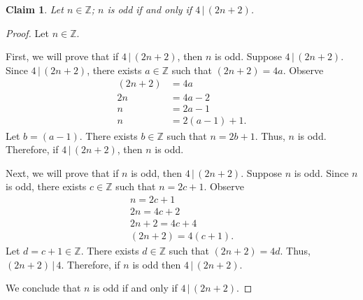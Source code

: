 \documentclass{article}
\newtheorem*{claim}{Claim}
\theoremstyle{definition}
\begin{document}
\begin{solution}
\begin{claim}
Let $n\in\mathbb{Z}$; $n$ is odd if and only if $4\,|\,(2n+2)$.
\end{claim}\begin{proof}
Let $n\in\mathbb{Z}$.

First, we will prove that if $4\,|\,(2n+2)$, then $n$ is odd. Suppose $4\,|\,(2n+2)$. Since $4\,|\,(2n+2)$, there exists $a\in\mathbb{Z}$ such that $(2n+2)=4a$. Observe
\begin{align*}
(2n+2)&=4a\\
2n&=4a-2\\
n&=2a-1\\
n&=2(a-1)+1.
\end{align*}
Let $b=(a-1)$. There exists $b\in\mathbb{Z}$ such that $n=2b+1$. Thus, $n$ is odd. Therefore, if $4\,|\,(2n+2)$, then $n$ is odd.

Next, we will prove that if $n$ is odd, then $4\,|\,(2n+2)$. Suppose $n$ is odd. Since $n$ is odd, there exists $c\in\mathbb{Z}$ such that $n=2c+1$. Observe
\begin{align*}
n=2c+1\\
2n=4c+2\\
2n+2=4c+4\\
(2n+2)=4(c+1).
\end{align*}
Let $d=c+1\in\mathbb{Z}$. There exists $d\in\mathbb{Z}$ such that $(2n+2)=4d$. Thus, $(2n+2)\,|\,4$. Therefore, if $n$ is odd then $4\,|\,(2n+2)$.

We conclude that $n$ is odd if and only if $4\,|\,(2n+2)$.
\end{proof}
\end{solution}
\end{document}
